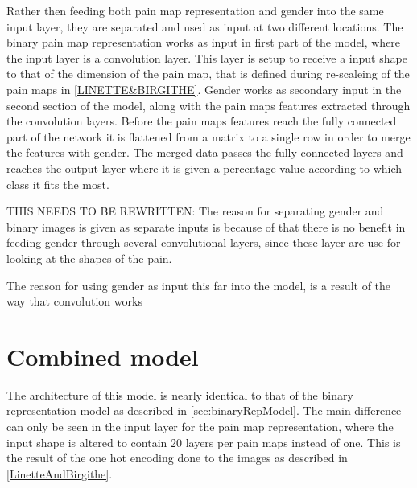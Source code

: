 Rather then feeding both pain map representation and gender into the same input layer, they are separated and used as input at two different locations. 
The binary pain map representation works as input in first part of the model, where the input layer is a convolution layer. 
This layer is setup to receive a input shape to that of the dimension of the pain map, that is defined during re-scaleing of the pain maps in \ref{LINETTE&BIRGITHE}. 
Gender works as secondary input in the second section of the model, along with the pain maps features extracted through the convolution layers. Before the pain maps features reach the fully connected part of the network it is flattened from a matrix to a single row in order to merge the features with gender. 
The merged data passes the fully connected layers and reaches the output layer where it is given a percentage value according to which class it fits the most. 


THIS NEEDS TO BE REWRITTEN: The reason for separating gender and binary images is given as separate inputs is because of that there is no benefit in feeding gender through several convolutional layers, since these layer are use for looking at the shapes of the pain.  

The reason for using gender as input this far into the model, is a result of the way that convolution works 



\section{Combined model}
The architecture of this model is nearly identical to that of the binary representation model as described in \ref{sec:binaryRepModel}. 
The main difference can only be seen in the input layer for the pain map representation, where the input shape is altered to contain 20 layers per pain maps instead of one. 
This is the result of the one hot encoding done to the images as described in \autoref{LinetteAndBirgithe}. 

